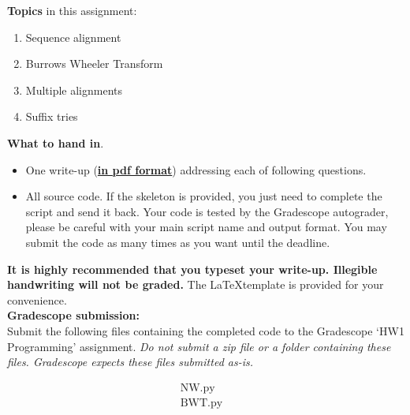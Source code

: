 \noindent 
{\bf Topics} in this assignment: 
\begin{enumerate}
\item Sequence alignment
\item Burrows Wheeler Transform
\item Multiple alignments
\item Suffix tries
\end{enumerate}
\vspace{0.2in}


\noindent 
{\bf What to hand in}. 
\begin{itemize}
\item One write-up (\underline{\textbf{in pdf format}}) addressing each of following questions.
\item All source code. If the skeleton is provided, you just need to complete the script and send it back. Your code is tested by the Gradescope autograder, please be careful with your main script name and output format. You may submit the code as many times as you want until the deadline.
\end{itemize}

\textbf{It is highly recommended that you typeset your write-up. Illegible handwriting will not be graded.} The \LaTeX template is provided for your convenience.\\

\noindent\textbf{Gradescope submission:}\\
Submit the following files containing the completed code to the Gradescope `HW1 Programming' assignment. \textit{Do not submit a zip file or a folder containing these files. Gradescope expects these files submitted as-is.}

\[
  \begin{array}{lllll}
    \text{NW.py}& \\
    \text{BWT.py}&
  \end{array}
\]
